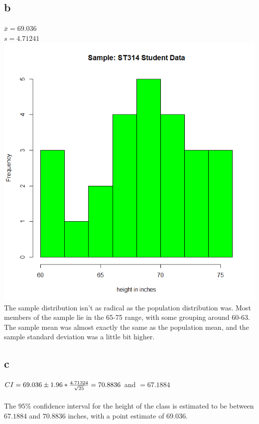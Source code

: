\documentclass[10pt,letterpaper]{article}
\begin{document}
\subsection*{b}
$\bar{x}=69.036$\\
$s=4.71241$\\
\includegraphics[scale=.5]{sample-student-hist}\\
The sample distribution isn't as radical as the population distribution was.
Most members of the sample lie in the 65-75 range, with some grouping around
60-63. The sample mean was almost exactly the same as the population mean, and
the sample standard deviation was a little bit higher.

\subsection*{c}
$CI=69.036 \pm 1.96*\frac{4.71324}{\sqrt{25}}\\\\
=70.8836$ and $=67.1884$\\\\
The $95\%$ confidence interval for the height of the class is estimated to be
between $67.1884$ and $70.8836$ inches, with a point estimate of $69.036$.
\end{document}
